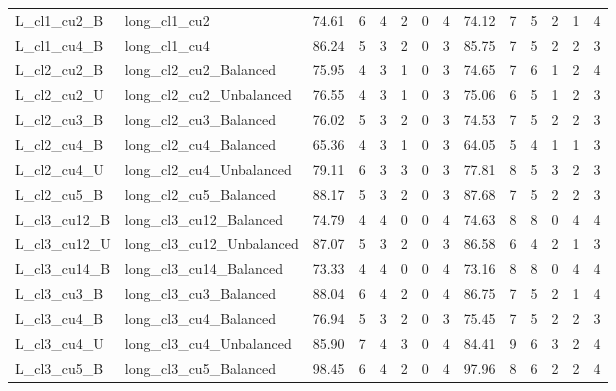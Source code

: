 \documentclass[3p,11pt,authoryear]{elsarticle}  %
\begin{document}
{\begin{longtable}{@{}llrrrrrrrrrrrr@{}}
L\_cl1\_cu2\_B & long\_cl1\_cu2 & 74.61 & 6 & 4 & 2 & 0 & 4 & 74.12 & 7 & 5 & 2 & 1 & 4 \\
L\_cl1\_cu4\_B & long\_cl1\_cu4 & 86.24 & 5 & 3 & 2 & 0 & 3 & 85.75 & 7 & 5 & 2 & 2 & 3 \\
L\_cl2\_cu2\_B & long\_cl2\_cu2\_Balanced & 75.95 & 4 & 3 & 1 & 0 & 3 & 74.65 & 7 & 6 & 1 & 2 & 4 \\
L\_cl2\_cu2\_U & long\_cl2\_cu2\_Unbalanced & 76.55 & 4 & 3 & 1 & 0 & 3 & 75.06 & 6 & 5 & 1 & 2 & 3 \\
L\_cl2\_cu3\_B & long\_cl2\_cu3\_Balanced & 76.02 & 5 & 3 & 2 & 0 & 3 & 74.53 & 7 & 5 & 2 & 2 & 3 \\
L\_cl2\_cu4\_B & long\_cl2\_cu4\_Balanced & 65.36 & 4 & 3 & 1 & 0 & 3 & 64.05 & 5 & 4 & 1 & 1 & 3 \\
L\_cl2\_cu4\_U & long\_cl2\_cu4\_Unbalanced & 79.11 & 6 & 3 & 3 & 0 & 3 & 77.81 & 8 & 5 & 3 & 2 & 3 \\
L\_cl2\_cu5\_B & long\_cl2\_cu5\_Balanced & 88.17 & 5 & 3 & 2 & 0 & 3 & 87.68 & 7 & 5 & 2 & 2 & 3 \\
L\_cl3\_cu12\_B & long\_cl3\_cu12\_Balanced & 74.79 & 4 & 4 & 0 & 0 & 4 & 74.63 & 8 & 8 & 0 & 4 & 4 \\
L\_cl3\_cu12\_U & long\_cl3\_cu12\_Unbalanced & 87.07 & 5 & 3 & 2 & 0 & 3 & 86.58 & 6 & 4 & 2 & 1 & 3 \\
L\_cl3\_cu14\_B & long\_cl3\_cu14\_Balanced & 73.33 & 4 & 4 & 0 & 0 & 4 & 73.16 & 8 & 8 & 0 & 4 & 4 \\
L\_cl3\_cu3\_B & long\_cl3\_cu3\_Balanced & 88.04 & 6 & 4 & 2 & 0 & 4 & 86.75 & 7 & 5 & 2 & 1 & 4 \\
L\_cl3\_cu4\_B & long\_cl3\_cu4\_Balanced & 76.94 & 5 & 3 & 2 & 0 & 3 & 75.45 & 7 & 5 & 2 & 2 & 3 \\
L\_cl3\_cu4\_U & long\_cl3\_cu4\_Unbalanced & 85.90 & 7 & 4 & 3 & 0 & 4 & 84.41 & 9 & 6 & 3 & 2 & 4 \\
L\_cl3\_cu5\_B & long\_cl3\_cu5\_Balanced & 98.45 & 6 & 4 & 2 & 0 & 4 & 97.96 & 8 & 6 & 2 & 2 & 4 \\
\bottomrule
\end{longtable}
}








\end{document}
